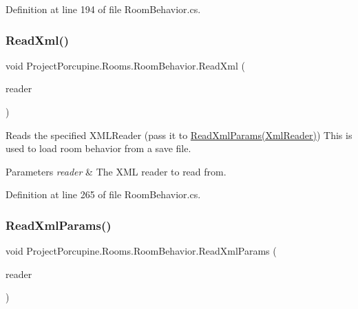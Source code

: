 Definition at line 194 of file Room\+Behavior.\+cs.

\mbox{\label{class_project_porcupine_1_1_rooms_1_1_room_behavior_a0374cb2dfc4feb34a3f380bb3528edfd}} 
\subsubsection{\texorpdfstring{Read\+Xml()}{ReadXml()}}
{\footnotesize\ttfamily void Project\+Porcupine.\+Rooms.\+Room\+Behavior.\+Read\+Xml (\begin{DoxyParamCaption}\item[{Xml\+Reader}]{reader }\end{DoxyParamCaption})}



Reads the specified X\+M\+L\+Reader (pass it to \hyperlink{class_project_porcupine_1_1_rooms_1_1_room_behavior_ae48ef51cb4429bf179c1730bdf5857e7}{Read\+Xml\+Params(\+Xml\+Reader)}) This is used to load room behavior from a save file. 


\begin{DoxyParams}{Parameters}
{\em reader} & The X\+ML reader to read from.\\
\hline
\end{DoxyParams}


Definition at line 265 of file Room\+Behavior.\+cs.

\mbox{\label{class_project_porcupine_1_1_rooms_1_1_room_behavior_ae48ef51cb4429bf179c1730bdf5857e7}} 
\subsubsection{\texorpdfstring{Read\+Xml\+Params()}{ReadXmlParams()}}
{\footnotesize\ttfamily void Project\+Porcupine.\+Rooms.\+Room\+Behavior.\+Read\+Xml\+Params (\begin{DoxyParamCaption}\item[{Xml\+Reader}]{reader }\end{DoxyParamCaption})}



